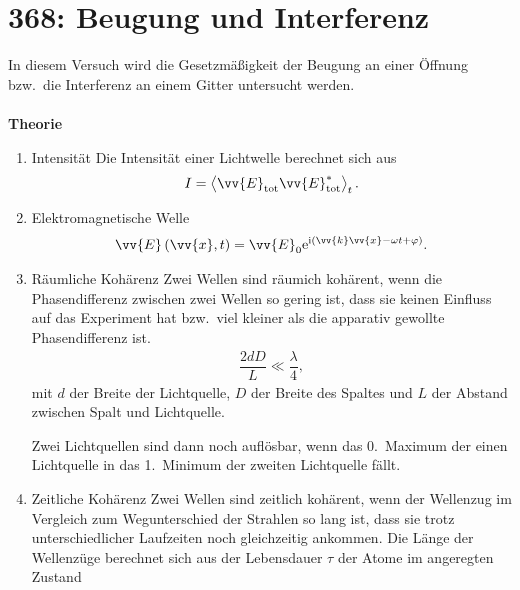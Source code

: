 \section{368: Beugung und Interferenz}
In diesem Versuch wird die Gesetzmäßigkeit der Beugung an einer Öffnung bzw.\ die Interferenz an einem Gitter untersucht werden.\\\\
\textbf{Theorie} 
\begin{enumerate}[label=--]
        \item Intensität \hspace{25pt}
                Die Intensität einer Lichtwelle berechnet sich aus
                \begin{align} 
                        I=\left\langle \vv{E}_\text{tot}\vv{E}_\text{tot}^*\right\rangle _t
                .\end{align} 
        \item Elektromagnetische Welle \hspace{25pt}
                \begin{align} 
                        \vv{E}\left(\vv{x},t\right)=\vv{E}_0\text{e}^{\text{i}\left(\vv{k}\vv{x}-\omega t+\varphi \right)}
                .\end{align} 
        \item Räumliche Kohärenz \hspace{25pt}
                Zwei Wellen sind räumich kohärent, wenn die Phasendifferenz zwischen zwei Wellen so gering ist, dass sie keinen Einfluss auf das Experiment hat bzw.\ viel kleiner als die apparativ gewollte Phasendifferenz ist.
                \begin{align} 
                        \dfrac{2dD}{L}\ll \dfrac{\lambda }{4}
                ,\end{align} 
                mit $d$ der Breite der Lichtquelle, $D$ der Breite des Spaltes und $L$ der Abstand zwischen Spalt und Lichtquelle.\par
                Zwei Lichtquellen sind dann noch auflösbar, wenn das 0.\ Maximum der einen Lichtquelle in das 1.\ Minimum der zweiten Lichtquelle fällt.
        \item Zeitliche Kohärenz \hspace{25pt}
                Zwei Wellen sind zeitlich kohärent, wenn der Wellenzug im Vergleich zum Wegunterschied der Strahlen so lang ist, dass sie trotz unterschiedlicher Laufzeiten noch gleichzeitig ankommen. Die Länge der Wellenzüge berechnet sich aus der Lebensdauer $\tau $ der Atome im angeregten Zustand

\end{enumerate}
